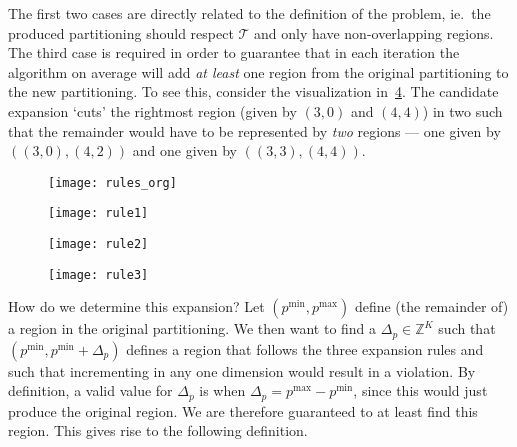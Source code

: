 \noindent The first two cases are directly related to the definition of the
problem, ie.\ the produced partitioning should respect $\mathcal{T}$ and only
have non-overlapping regions. The third case is required in order to guarantee
that in each iteration the algorithm on average will add \textit{at least} one
region from the original partitioning to the new partitioning. To see this,
consider the visualization in~\cref{fig:expRules3}. The candidate expansion
`cuts' the rightmost region (given by $(3,0)$ and $(4,4)$) in two such that the
remainder would have to be represented by \textit{two} regions --- one given
by $((3,0), (4,2))$ and one given by $((3,3), (4,4))$.

\begin{figure*}[ht]
    \centering
    \begin{subfigure}{0.24\textwidth}
        \texttt{[image: rules\_org]}%
        \caption{}%
        \label{fig:expRulesOrg}
    \end{subfigure}
    \begin{subfigure}{0.24\textwidth}
      \texttt{[image: rule1]}%
      \caption{}%
      \label{fig:expRules1}
    \end{subfigure}
    \begin{subfigure}{0.24\textwidth}
      \texttt{[image: rule2]}%
      \caption{}%
      \label{fig:expRules2}
    \end{subfigure}
    \begin{subfigure}{0.24\textwidth}
      \texttt{[image: rule3]}%
      \caption{}%
      \label{fig:expRules3}
    \end{subfigure}

  \caption{%
      A visual example of the 3 expansion rules. Striped regions indicate that
      the algorithm has covered this part in a previous iteration, whereas the
      shaded region with a dashed border is a candidate expanded
      region.~\cref{fig:expRulesOrg} shows a potential input partitioning.
      In~\cref{fig:expRules1} the expansion is illegal according to Rule 1,
      since the expanded region contains two different actions
      (colors).~\cref{fig:expRules2} violates Rule 2, since the expanded region
      overlaps with a striped area.~\cref{fig:expRules3} shows a representation
      of the 3rd rule, as the expansion would `cut' the rightmost region in two.
  }%
  \label{fig:expansionRules}
\end{figure*}


How do we determine this expansion? Let $(p^{\min}, p^{\max})$ define (the
remainder of) a region in the original partitioning. We then want to find a
$\Delta_p \in \mathbb{Z}^K$ such that $(p^{\min}, p^{\min} + \Delta_p)$ defines
a region that follows the three expansion rules and such that incrementing in
any one dimension would result in a violation. By definition, a valid value for
$\Delta_p$ is when $\Delta_p = p^{\max} - p^{\min}$, since this would just
produce the original region. We are therefore guaranteed to at least find this
region. This gives rise to the following definition.

